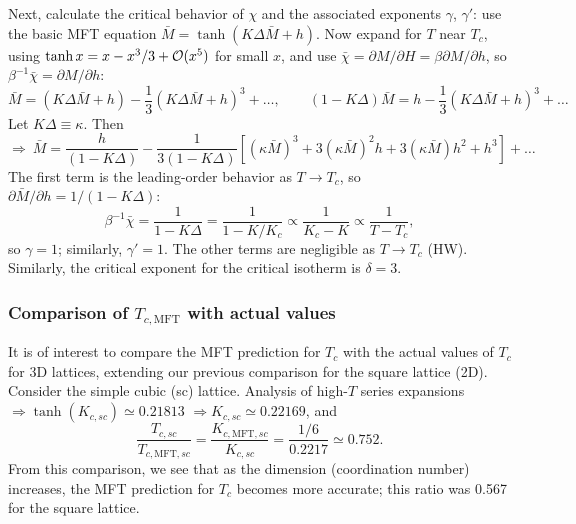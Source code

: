 Next, calculate the critical behavior of $\chi$ and the associated exponents $\gamma$, $\gamma'$:
use the basic MFT equation $\bar M = \tanh(K\Delta\bar M + h)$. Now expand for $T$ near $T_c$, using
$\tanh x = x - x^3/3 + \mathcal{O}(x^5)$ for small $x$, and use
$\bar\chi = \partial M/\partial H = \beta\partial M/\partial h$, so $\beta^{-1}\bar\chi = \partial M/\partial h$:
\begin{equation}
  \bar M = (K\Delta\bar M + h) - \frac{1}{3}(K\Delta\bar M+h)^3+\ldots,\qquad
  (1-K\Delta)\bar M = h - \frac{1}{3}(K\Delta\bar M+h)^3+\ldots
\end{equation}
Let $K\Delta\equiv\kappa$. Then
\begin{equation}
  \Rightarrow\ \bar M = \frac{h}{(1-K\Delta)} - \frac{1}{3(1-K\Delta)}\left[(\kappa\bar M)^3 + 3(\kappa\bar M)^2h + 3(\kappa\bar M)h^2 + h^3\right]+\ldots
\end{equation}
The first term is the leading-order behavior as $T\to T_c$, so $\partial \bar M/\partial h = 1/(1-K\Delta)$:
\begin{equation}
  \beta^{-1}\bar\chi = \frac{1}{1-K\Delta} = \frac{1}{1-K/K_c}\propto\frac{1}{K_c-K}\propto\frac{1}{T-T_c},
\end{equation}
so $\gamma = 1$; similarly, $\gamma' = 1$. The other terms are negligible as $T\to T_c$ (HW).
Similarly, the critical exponent for the critical isotherm is $\delta = 3$.

\subsubsection*{Comparison of \texorpdfstring{$T_{c,\text{MFT}}$}{Tc,MFT} with actual values}

It is of interest to compare the MFT prediction for $T_c$ with the actual values of $T_c$ for 3D
lattices, extending our previous comparison for the square lattice (2D). Consider the simple cubic
(sc) lattice. Analysis of high-$T$ series expansions $\Rightarrow\tanh(K_{c,sc})\simeq 0.21813$
$\Rightarrow K_{c,sc}\simeq 0.22169$, and
\begin{equation}
  \frac{T_{c,sc}}{T_{c,\text{MFT},sc}} = \frac{K_{c,\text{MFT},sc}}{K_{c,sc}} = \frac{1/6}{0.2217}\simeq 0.752 .
\end{equation}
From this comparison, we see that as the dimension (coordination number) increases, the MFT
prediction for $T_c$ becomes more accurate; this ratio was 0.567 for the square lattice.

